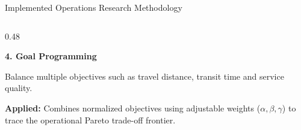 \documentclass[aspectratio=169,10pt]{beamer}
\begin{document}
\begin{frame}{Implemented Operations Research Methodology}
\begin{columns}[T,totalwidth=\textwidth]
\begin{column}{0.48\textwidth}
\vspace{0.22cm}

\textbf{\color{Primary}\small 4. Goal Programming}

\vspace{0.05cm}

\footnotesize
Balance multiple objectives such as travel distance, transit time and service quality.

\vspace{0.04cm}

\textcolor{Muted}{\scriptsize
\textbf{Applied:} Combines normalized objectives using adjustable weights ($\alpha, \beta, \gamma$) to trace the operational Pareto trade-off frontier.
}

\end{column}

\end{columns}
\end{frame}

\end{document}
